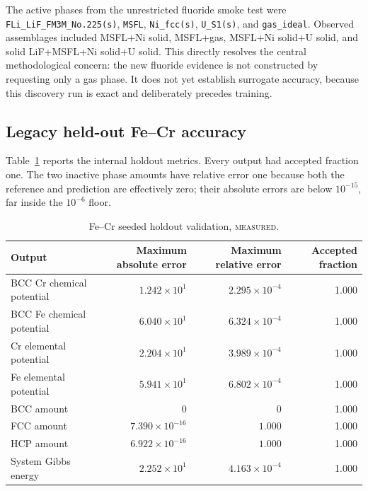 \documentclass[11pt]{article}
\newcommand{\code}[1]{\texttt{#1}}
\newcommand{\measured}{\textsc{measured}}
\begin{document}
The active phases from the unrestricted fluoride smoke test were
\code{FLi\_LiF\_FM3M\_No.225(s)}, \code{MSFL}, \code{Ni\_fcc(s)}, \code{U\_S1(s)}, and
\code{gas\_ideal}.  Observed assemblages included MSFL+Ni solid, MSFL+gas,
MSFL+Ni solid+U solid, and solid LiF+MSFL+Ni solid+U solid.  This directly resolves the central
methodological concern: the new fluoride evidence is not constructed by requesting only a gas
phase.  It does not yet establish surrogate accuracy, because this discovery run is exact and
deliberately precedes training.

\subsection{Legacy held-out Fe--Cr accuracy}

Table~\ref{tab:fecr-validation} reports the internal holdout metrics.  Every output had accepted
fraction one.  The two inactive phase amounts have relative error one because both the reference
and prediction are effectively zero; their absolute errors are below \(10^{-15}\), far inside the
\(10^{-6}\) floor.

\begin{table}[htbp]
  \centering
  \caption{Fe--Cr seeded holdout validation, \measured.}
  \label{tab:fecr-validation}
  \small
  \begin{tabular}{lrrr}
    \toprule
    Output & Maximum absolute error & Maximum relative error & Accepted fraction \\
    \midrule
    BCC Cr chemical potential & \(1.242\times10^{1}\) & \(2.295\times10^{-4}\) & 1.000 \\
    BCC Fe chemical potential & \(6.040\times10^{1}\) & \(6.324\times10^{-4}\) & 1.000 \\
    Cr elemental potential & \(2.204\times10^{1}\) & \(3.989\times10^{-4}\) & 1.000 \\
    Fe elemental potential & \(5.941\times10^{1}\) & \(6.802\times10^{-4}\) & 1.000 \\
    BCC amount & \(0\) & \(0\) & 1.000 \\
    FCC amount & \(7.390\times10^{-16}\) & \(1.000\) & 1.000 \\
    HCP amount & \(6.922\times10^{-16}\) & \(1.000\) & 1.000 \\
    System Gibbs energy & \(2.252\times10^{1}\) & \(4.163\times10^{-4}\) & 1.000 \\
    \bottomrule
  \end{tabular}
\end{table}
\end{document}
